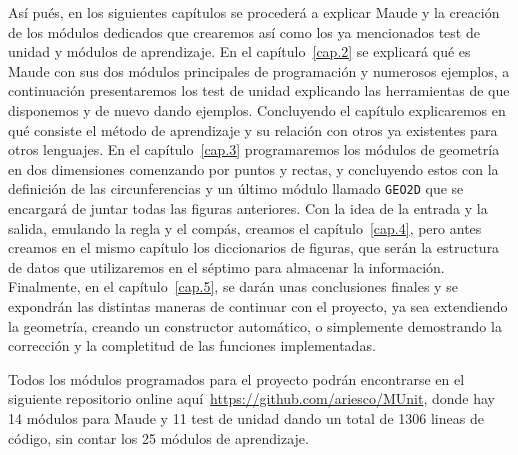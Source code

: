 Así pués, en los siguientes capítulos se procederá a explicar Maude y la creación de los módulos dedicados que crearemos así como los ya mencionados test de unidad y módulos de aprendizaje. En el capítulo~\ref{cap.2} se explicará qué es Maude con sus dos módulos principales de programación y numerosos ejemplos, a continuación presentaremos los test de unidad explicando las herramientas de que disponemos y de nuevo dando ejemplos. Concluyendo el capítulo explicaremos en qué consiste el método de aprendizaje y su relación con otros ya existentes para otros lenguajes. En el capítulo~\ref{cap.3} programaremos los módulos de geometría en dos dimensiones comenzando por puntos y rectas, y concluyendo estos con la definición de las circunferencias y un último módulo llamado \texttt{GEO2D} que se encargará de juntar todas las figuras anteriores. Con la idea de la entrada y la salida, emulando la regla y el compás, creamos el capítulo~\ref{cap.4}, pero antes creamos en el mismo capítulo los diccionarios de figuras, que serán la estructura de datos que utilizaremos en el séptimo para almacenar la información. Finalmente, en el capítulo~\ref{cap.5}, se darán unas conclusiones finales y se expondrán las distintas maneras de continuar con el proyecto, ya sea extendiendo la geometría, creando un constructor automático, o simplemente demostrando la corrección y la completitud de las funciones implementadas.\par

Todos los módulos programados para el proyecto podrán encontrarse en el siguiente repositorio online aquí~\url{https://github.com/ariesco/MUnit}, donde hay 14 módulos para Maude y 11 test de unidad dando un total de 1306 lineas de código, sin contar los 25 módulos de aprendizaje. %
